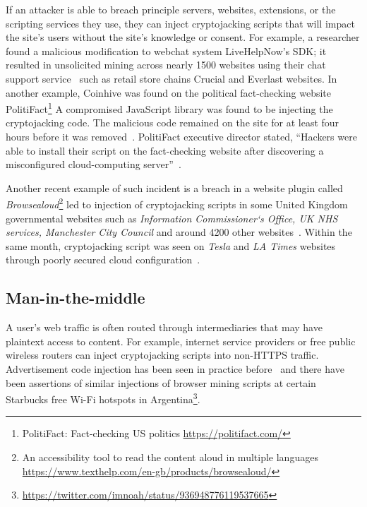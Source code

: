 If an attacker is able to breach principle servers, websites, extensions, or the scripting services they use, they can inject cryptojacking scripts that will impact the site's users without the site's knowledge or consent. For example, a researcher found a malicious modification to webchat system LiveHelpNow's SDK; it resulted in unsolicited mining across nearly 1500 websites using their chat support service~\cite{chatsupporthack} such as retail store chains Crucial and Everlast websites. In another example, Coinhive was found on the political fact-checking website PolitiFact\footnote{PolitiFact: Fact-checking US politics \url{https://politifact.com/}} A compromised JavaScript library was found to be injecting the cryptojacking code. The malicious code remained on the site for at least four hours before it was removed~\cite{politifactcoinhive}. PolitiFact executive director stated, ``Hackers were able to install their script on the fact-checking website after discovering a misconfigured cloud-computing server''~\cite{politifactcoinhivewsj}. 

Another recent example of such incident is a breach in a website plugin called \textit{Browsealoud}\footnote{An accessibility tool to read the content aloud in multiple languages \url{https://www.texthelp.com/en-gb/products/browsealoud/}} led to injection of cryptojacking scripts in some United Kingdom governmental websites such as \textit{Information Commissioner`s Office, UK NHS services, Manchester City Council} and around 4200 other websites~\cite{theregisterukgovern}. Within the same month, cryptojacking script was seen on \textit{Tesla} and \textit{LA Times} websites through poorly secured cloud configuration~\cite{nakedsecurityLatimes}.

\subsection{Man-in-the-middle} 

A user's web traffic is often routed through intermediaries that may have plaintext access to content. For example, internet service providers or free public wireless routers can inject cryptojacking scripts into non-HTTPS traffic. Advertisement code injection has been seen in practice before~\cite{vergeadinjection} and there have been assertions of similar injections of browser mining scripts at certain Starbucks free Wi-Fi hotspots in Argentina\footnote{\url{https://twitter.com/imnoah/status/936948776119537665}}.




